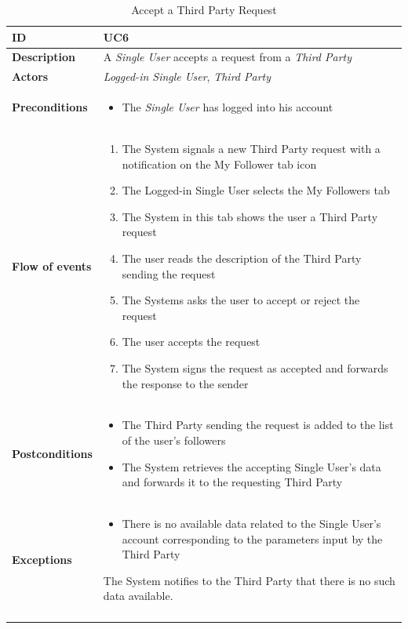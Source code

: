 \documentclass[titlepage]{article}
\begin{document}

\begin{longtable}{| p{3 cm} | p{10 cm} |} 
			\hline
			{\bf ID} & UC6 \\
			\hline
			{\bf Description} & A {\it Single User} accepts a request from a {\it Third Party}\\
			\hline
			{\bf Actors} & {\it Logged-in Single User}, {\it Third Party} \\
			\hline
			{\bf Preconditions} & 		
							\begin{itemize}
								\item The {\it Single User}  has  logged into his account 
							\end{itemize}
			\\
			\hline
			{\bf Flow of events} & 
							\begin{enumerate}
								\item The System signals a new Third Party request with a notification on the My Follower tab icon
\item The Logged-in Single User selects the My Followers tab
\item The System  in this tab shows the user a Third Party request
\item The user reads the description of the Third Party sending the request
\item The Systems asks the user to accept or reject the request
\item The user accepts the request
\item The System signs the request as accepted and forwards the response to the sender
							\end{enumerate}
			
			 \\
			\hline
			{\bf Postconditions} & 
							\begin{itemize}
								\item The Third Party sending the request is added to the list of the user’s followers
\item The System retrieves the accepting Single User’s data and forwards it to the requesting Third Party 


							\end{itemize}
			\\
			\hline
			{\bf Exceptions} & 
							\begin{itemize}
								\item There is no available data related to the Single User’s account corresponding to the parameters input by the Third Party
							\end{itemize}
							The System notifies to the Third Party that there is no such data available.

							
			\\
			\hline
			\caption{Accept a Third Party Request}
			\end{longtable}
\end{document}
